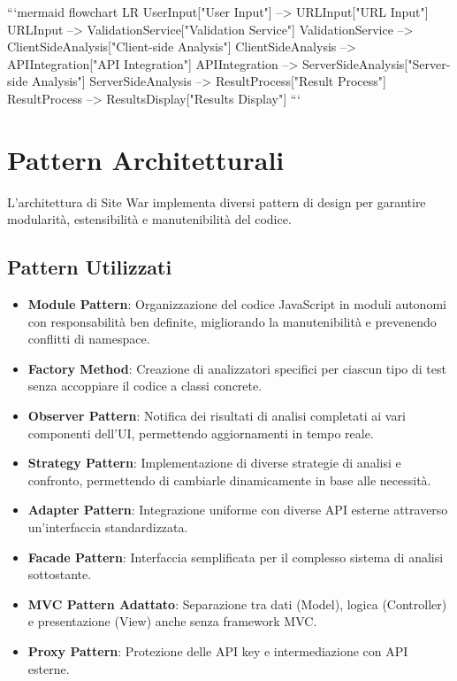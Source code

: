 ```mermaid
flowchart LR
    UserInput["User Input"] --> URLInput["URL Input"] 
    URLInput --> ValidationService["Validation Service"]
    ValidationService --> ClientSideAnalysis["Client-side Analysis"]
    ClientSideAnalysis --> APIIntegration["API Integration"]
    APIIntegration --> ServerSideAnalysis["Server-side Analysis"]
    ServerSideAnalysis --> ResultProcess["Result Process"]
    ResultProcess --> ResultsDisplay["Results Display"]
```

\section{Pattern Architetturali}
L'architettura di Site War implementa diversi pattern di design per garantire modularità, estensibilità e manutenibilità del codice.

\subsection{Pattern Utilizzati}

\begin{itemize}
    \item \textbf{Module Pattern}: Organizzazione del codice JavaScript in moduli autonomi con responsabilità ben definite, migliorando la manutenibilità e prevenendo conflitti di namespace.
    
    \item \textbf{Factory Method}: Creazione di analizzatori specifici per ciascun tipo di test senza accoppiare il codice a classi concrete.
    
    \item \textbf{Observer Pattern}: Notifica dei risultati di analisi completati ai vari componenti dell'UI, permettendo aggiornamenti in tempo reale.
    
    \item \textbf{Strategy Pattern}: Implementazione di diverse strategie di analisi e confronto, permettendo di cambiarle dinamicamente in base alle necessità.
    
    \item \textbf{Adapter Pattern}: Integrazione uniforme con diverse API esterne attraverso un'interfaccia standardizzata.
    
    \item \textbf{Facade Pattern}: Interfaccia semplificata per il complesso sistema di analisi sottostante.
    
    \item \textbf{MVC Pattern Adattato}: Separazione tra dati (Model), logica (Controller) e presentazione (View) anche senza framework MVC.
    
    \item \textbf{Proxy Pattern}: Protezione delle API key e intermediazione con API esterne.
\end{itemize}

